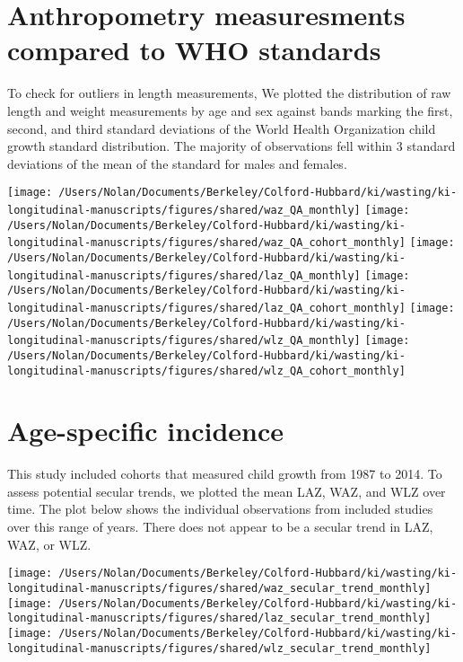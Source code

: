\documentclass[9pt,]{book}
\begin{document}
\raggedright

\section{Anthropometry measuresments compared to WHO
standards}\label{anthropometry-measuresments-compared-to-who-standards}

To check for outliers in length measurements, We plotted the
distribution of raw length and weight measurements by age and sex
against bands marking the first, second, and third standard deviations
of the World Health Organization child growth standard distribution. The
majority of observations fell within 3 standard deviations of the mean
of the standard for males and females.

\texttt{[image: /Users/Nolan/Documents/Berkeley/Colford-Hubbard/ki/wasting/ki-longitudinal-manuscripts/figures/shared/waz\_QA\_monthly]}
\texttt{[image: /Users/Nolan/Documents/Berkeley/Colford-Hubbard/ki/wasting/ki-longitudinal-manuscripts/figures/shared/waz\_QA\_cohort\_monthly]}
\texttt{[image: /Users/Nolan/Documents/Berkeley/Colford-Hubbard/ki/wasting/ki-longitudinal-manuscripts/figures/shared/laz\_QA\_monthly]}
\texttt{[image: /Users/Nolan/Documents/Berkeley/Colford-Hubbard/ki/wasting/ki-longitudinal-manuscripts/figures/shared/laz\_QA\_cohort\_monthly]}
\texttt{[image: /Users/Nolan/Documents/Berkeley/Colford-Hubbard/ki/wasting/ki-longitudinal-manuscripts/figures/shared/wlz\_QA\_monthly]}
\texttt{[image: /Users/Nolan/Documents/Berkeley/Colford-Hubbard/ki/wasting/ki-longitudinal-manuscripts/figures/shared/wlz\_QA\_cohort\_monthly]}

\section{Age-specific incidence}\label{age-specific-incidence-2}

This study included cohorts that measured child growth from 1987 to
2014. To assess potential secular trends, we plotted the mean LAZ, WAZ,
and WLZ over time. The plot below shows the individual observations from
included studies over this range of years. There does not appear to be a
secular trend in LAZ, WAZ, or WLZ.

\texttt{[image: /Users/Nolan/Documents/Berkeley/Colford-Hubbard/ki/wasting/ki-longitudinal-manuscripts/figures/shared/waz\_secular\_trend\_monthly]}
\texttt{[image: /Users/Nolan/Documents/Berkeley/Colford-Hubbard/ki/wasting/ki-longitudinal-manuscripts/figures/shared/laz\_secular\_trend\_monthly]}
\texttt{[image: /Users/Nolan/Documents/Berkeley/Colford-Hubbard/ki/wasting/ki-longitudinal-manuscripts/figures/shared/wlz\_secular\_trend\_monthly]}


\end{document}
